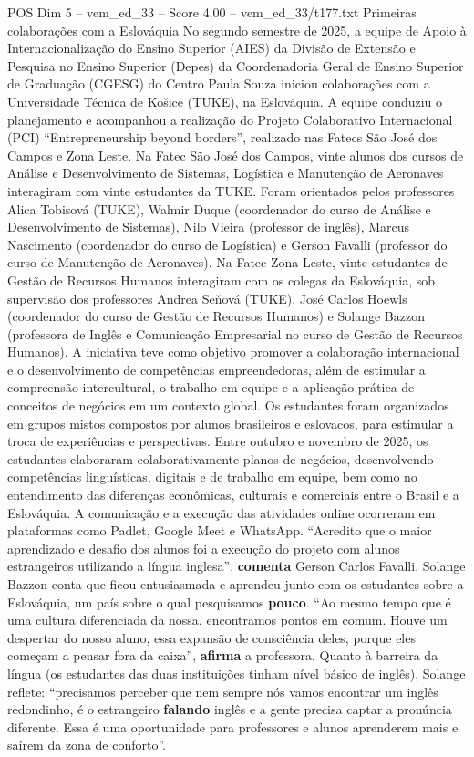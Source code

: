 \begin{textsample}{POS Dim 5 – vem\_ed\_33 – Score 4.00 – vem\_ed\_33/t177.txt}  \label{ex:f5_pos_100}
Primeiras colaborações com a Eslováquia No segundo semestre de 2025, a equipe de Apoio à Internacionalização do Ensino Superior (AIES) da Divisão de Extensão e Pesquisa no Ensino Superior (Depes) da Coordenadoria Geral de Ensino Superior de Graduação (CGESG) do Centro Paula Souza iniciou colaborações com a Universidade Técnica de Košice (TUKE), na Eslováquia.
A equipe conduziu o planejamento e acompanhou a realização do Projeto Colaborativo Internacional (PCI) “Entrepreneurship beyond borders”, realizado nas Fatecs São José dos Campos e Zona Leste.
Na Fatec São José dos Campos, vinte alunos dos cursos de Análise e Desenvolvimento de Sistemas, Logística e Manutenção de Aeronaves interagiram com vinte estudantes da TUKE.
Foram orientados pelos professores Alica Tobisová (TUKE), Walmir Duque (coordenador do curso de Análise e Desenvolvimento de Sistemas), Nilo Vieira (professor de inglês), Marcus Nascimento (coordenador do curso de Logística) e Gerson Favalli (professor do curso de Manutenção de Aeronaves).
Na Fatec Zona Leste, vinte estudantes de Gestão de Recursos Humanos interagiram com os colegas da Eslováquia, sob supervisão dos professores Andrea Seňová (TUKE), José Carlos Hoewls (coordenador do curso de Gestão de Recursos Humanos) e Solange Bazzon (professora de Inglês e Comunicação Empresarial no curso de Gestão de Recursos Humanos).
A iniciativa teve como objetivo promover a colaboração internacional e o desenvolvimento de competências empreendedoras, além de estimular a compreensão intercultural, o trabalho em equipe e a aplicação prática de conceitos de negócios em um contexto global.
Os estudantes foram organizados em grupos mistos compostos por alunos brasileiros e eslovacos, para estimular a troca de experiências e perspectivas.
Entre outubro e novembro de 2025, os estudantes elaboraram colaborativamente planos de negócios, desenvolvendo competências linguísticas, digitais e de trabalho em equipe, bem como no entendimento das diferenças econômicas, culturais e comerciais entre o Brasil e a Eslováquia.
A comunicação e a execução das atividades online ocorreram em plataformas como Padlet, Google Meet e WhatsApp. “Acredito que o maior aprendizado e desafio dos alunos foi a execução do projeto com alunos estrangeiros utilizando a língua inglesa”, \textbf{comenta} Gerson Carlos Favalli.
Solange Bazzon conta que ficou entusiasmada e aprendeu junto com os estudantes sobre a Eslováquia, um país sobre o qual pesquisamos \textbf{pouco}. “Ao mesmo tempo que é uma cultura diferenciada da nossa, encontramos pontos em comum.
Houve um despertar do nosso aluno, essa expansão de consciência deles, porque eles começam a pensar fora da caixa”, \textbf{afirma} a professora.
Quanto à barreira da língua (os estudantes das duas instituições tinham nível básico de inglês), Solange reflete: “precisamos perceber que nem sempre nós vamos encontrar um inglês redondinho, é o estrangeiro \textbf{falando} inglês e a gente precisa captar a pronúncia diferente.
Essa é uma oportunidade para professores e alunos aprenderem mais e saírem da zona de conforto”.

\end{textsample}
